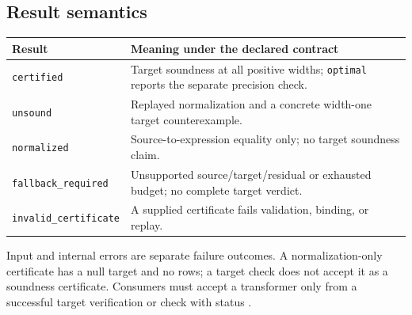 \subsection{Result semantics}
\begin{center}
\begin{tabularx}{\textwidth}{@{}lX@{}}
\toprule
Result & Meaning under the declared contract\\\midrule
\texttt{certified} & Target soundness at all positive widths; \texttt{optimal} reports the separate precision check.\\
\texttt{unsound} & Replayed normalization and a concrete width-one target counterexample.\\
\texttt{normalized} & Source-to-expression equality only; no target soundness claim.\\
\texttt{fallback\_required} & Unsupported source/target/residual or exhausted budget; no complete target verdict.\\
\texttt{invalid\_certificate} & A supplied certificate fails validation, binding, or replay.\\
\bottomrule
\end{tabularx}
\end{center}
Input and internal errors are separate failure outcomes. A normalization-only certificate has a null target and no rows; a target check does not accept it as a soundness certificate. Consumers must accept a transformer only from a successful target verification or check with status \certified.
